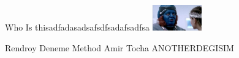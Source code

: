 \documentclass{exam}
\begin{document}
\begin{questions}
\question Who Is thisadfadasadsafsdfsadafsadfsa\newline
\includegraphics[height=3em]{rendroy2.jpg} \newline
\begin{oneparchoices}
\choice Rendroy
\choice Deneme Method
\choice Amir Tocha
\choice ANOTHERDEGISIM
\end{oneparchoices}
\end{questions}
\end{document}
